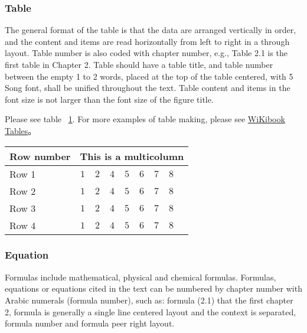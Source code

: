 \subsubsection{Table}
The general format of the table is that the data are arranged vertically in order, and the content and items are read horizontally from left to right in a through layout. Table number is also coded with chapter number, e.g., Table 2.1 is the first table in Chapter 2. Table should have a table title, and table number between the empty 1 to 2 words, placed at the top of the table centered, with 5 Song font, shall be unified throughout the text. Table content and items in the font size is not larger than the font size of the figure title.

Please see table ~\ref{tab:sample}. For more examples of table making, please see  \href{https://en.wikibooks.org/wiki/LaTeX/Tables}{WiKibook Tables}。
\begin{table}[!htbp]
    \centering
    \footnotesize%
    \setlength{\tabcolsep}{4pt}%
    \renewcommand{\arraystretch}{1.2}%
    \begin{tabular}{lcccccccc}
        \hline
        Row number & \multicolumn{8}{c}{This is a multicolumn} \\
        \hline
        Row 1 & $1$ & $2$ & $4$ & $5$ & $6$ & $7$ & $8$\\
        Row 2 & $1$ & $2$ & $4$ & $5$ & $6$ & $7$ & $8$\\
        Row 3 & $1$ & $2$ & $4$ & $5$ & $6$ & $7$ & $8$\\
        Row 4 & $1$ & $2$ & $4$ & $5$ & $6$ & $7$ & $8$\\
        \hline
    \end{tabular}
    \label{tab:sample}
\end{table}


\subsubsection{Equation}
Formulas include mathematical, physical and chemical formulas. Formulas, equations or equations cited in the text can be numbered by chapter number with Arabic numerals (formula number), such as: formula (2.1) that the first chapter 2, formula is generally a single line centered layout and the context is separated, formula number and formula peer right layout.

